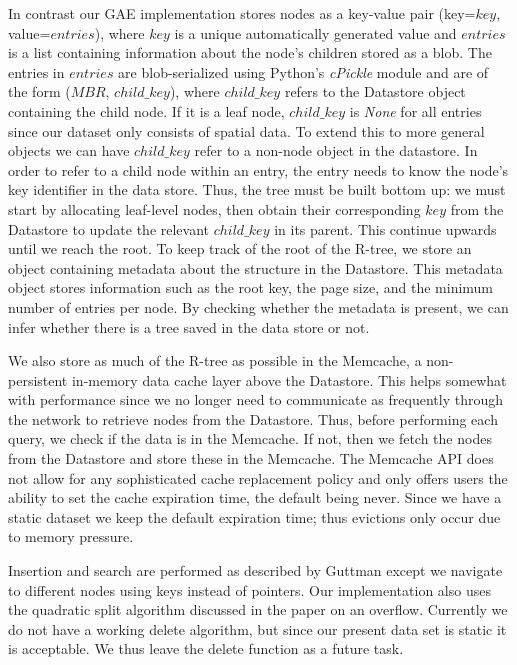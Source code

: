 \documentclass{scrartcl}
\begin{document}
In contrast our GAE implementation stores nodes as a key-value pair (key=$key$, value=$entries$), where $key$ is a unique automatically generated value and $entries$ is a list containing information about the node's children stored as a blob. The entries in $entries$ are blob-serialized using Python's \textit{cPickle} module and are of the form ($MBR$, $child\_key$), where $child\_key$ refers to the Datastore object containing the child node. If it is a leaf node, $child\_key$ is \textit{None} for all entries since our dataset only consists of spatial data. To extend this to more general objects we can have $child\_key$ refer to a non-node object in the datastore. In order to refer to a child node within an entry, the entry needs to know the node's key identifier in the data store. Thus, the tree must be built bottom up: we must start by allocating leaf-level nodes, then obtain their corresponding $key$ from the Datastore to update the relevant $child\_key$ in its parent. This continue upwards until we reach the root. To keep track of the root of the R-tree, we store an object containing metadata about the structure in the Datastore. This metadata object stores information such as the root key, the page size, and the minimum number of entries per node. By checking whether the metadata is present, we can infer whether there is a tree saved in the data store or not.

We also store as much of the R-tree as possible in the Memcache, a non-persistent in-memory data cache layer above the Datastore. This helps somewhat with performance since we no longer need to communicate as frequently through the network to retrieve nodes from the Datastore. Thus, before performing each query, we check if the data is in the Memcache. If not, then we fetch the nodes from the Datastore and store these in the Memcache. The Memcache API does not allow for any sophisticated cache replacement policy and only offers users the ability to set the cache expiration time, the default being never. Since we have a static dataset we keep the default expiration time; thus evictions only occur due to memory pressure.

Insertion and search are performed as described by Guttman\cite{DBLP:conf/sigmod/Guttman84} except we navigate to different nodes using keys instead of pointers. Our implementation also uses the quadratic split algorithm discussed in the paper on an overflow. Currently we do not have a working delete algorithm, but since our present data set is static it is acceptable. We thus leave the delete function as a future task. 
\end{document}
